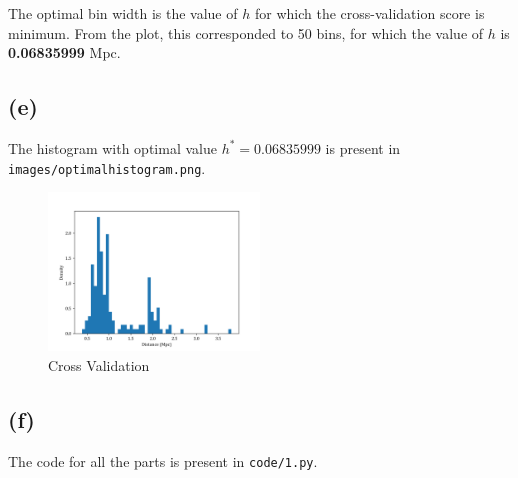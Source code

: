 The optimal bin width is the value of $h$ for which the cross-validation score is
minimum. From the plot, this corresponded to 50 bins, for which the value of $h$
is \textbf{0.06835999} Mpc.

\subsection*{(e)}

The histogram with optimal value $h^* = 0.06835999$ is present in
\texttt{images/optimalhistogram.png}.

\begin{figure}[H]
  \centering
  \includegraphics[width=0.5\textwidth]{assets/images/optimalhistogram.png}
  \caption{Cross Validation}
\end{figure}

\subsection*{(f)}

The code for all the parts is present in \texttt{code/1.py}. 
